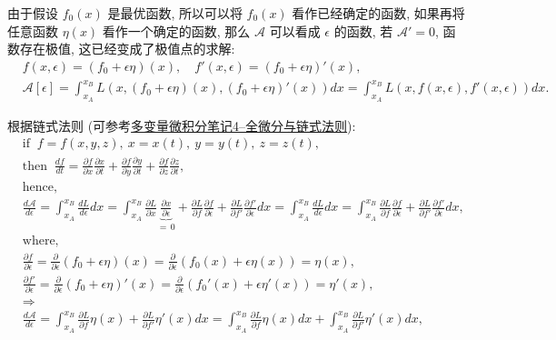 \documentclass[cn,hazy,blue,14pt,screen]{./cls/elegantnote}
\begin{document}
由于假设 $ f_0(x) $ 是最优函数, 所以可以将 $ f_0(x) $ 看作已经确定的函数, 如果再将任意函数 $ \eta(x) $ 看作一个确定的函数, 那么 $ \mathcal{A} $ 可以看成 $ \epsilon $ 的函数, 若 $ \mathcal{A}' = 0 $, 函数存在极值, 这已经变成了极值点的求解:
\begin{align*}
 	&f(x,\epsilon) = (f_0+\epsilon\eta)(x), \quad f'(x,\epsilon) = (f_0+\epsilon\eta)'(x), \\
 	&\mathcal{A}[\epsilon] = \int_{x_A}^{x_B}L(x,(f_0+\epsilon\eta)(x), (f_0+\epsilon\eta)'(x) )dx = \int_{x_A}^{x_B} L(x,f(x,\epsilon),f'(x,\epsilon))dx.
\end{align*}

根据链式法则 (可参考\href{https://www.cnblogs.com/bigmonkey/p/8350943.html}{多变量微积分笔记4--全微分与链式法则}):
\begin{align*}
 	&\text{if }\ f = f(x,y,z), \ x=x(t), \ y = y(t), \ z=z(t), \\
 	&\text{then }\ \frac{df}{dt} = \frac{\partial f}{\partial x} \frac{\partial x}{\partial t} +  \frac{\partial f}{\partial y} \frac{\partial y}{\partial t} +  \frac{\partial f}{\partial z} \frac{\partial z}{\partial t}, \\
 	&\text{hence, } \\
 	&\frac{d\mathcal{A}}{d\epsilon} = \int_{x_A}^{x_B} \frac{dL}{d\epsilon} dx = \int_{x_A}^{x_B} \frac{\partial L}{\partial x} \underset{=\,0}{\underbrace{\frac{\partial x}{\partial \epsilon}}} + \frac{\partial L}{\partial f} \frac{\partial f}{\partial \epsilon} + \frac{\partial L}{\partial f'} \frac{\partial f'}{\partial \epsilon} dx = \int_{x_A}^{x_B} \frac{dL}{d\epsilon} dx = \int_{x_A}^{x_B} \frac{\partial L}{\partial f} \frac{\partial f}{\partial \epsilon} + \frac{\partial L}{\partial f'} \frac{\partial f'}{\partial \epsilon} dx, \\
 	&\text{where, } \\
 	&\frac{\partial f}{\partial\epsilon} = \frac{\partial}{\partial\epsilon}(f_0+\epsilon\eta)(x) = \frac{\partial}{\partial\epsilon}(f_0(x)+\epsilon\eta(x)) = \eta(x), \\
 	&\frac{\partial f'}{\partial\epsilon} = \frac{\partial}{\partial\epsilon}(f_0+\epsilon\eta)'(x) = \frac{\partial}{\partial\epsilon}(f_0'(x)+\epsilon\eta'(x)) = \eta'(x), \\
 	& \Longrightarrow \\
 	& \frac{d\mathcal{A}}{d\epsilon} = \int_{x_A}^{x_B}\frac{\partial L}{\partial f}\eta(x) + \frac{\partial L}{\partial f'}\eta'(x) dx = \int_{x_A}^{x_B} \frac{\partial L}{\partial f}\eta(x) dx + \int_{x_A}^{x_B} \frac{\partial L}{\partial f'}\eta'(x) dx,
\end{align*}
\end{document}
